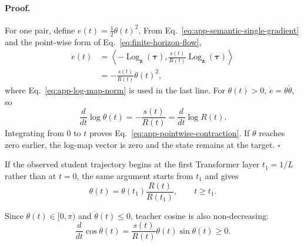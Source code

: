 \paragraph{Proof.}
For one pair, define $e(t)=\tfrac{1}{2}\theta(t)^2$. From
Eq.~\ref{eq:app-semantic-single-gradient} and the point-wise form of
Eq.~\ref{eq:finite-horizon-flow},
\begin{align}
    \dot{e}(t)
    &=
    \left\langle
        -\operatorname{Log}_{\mathbf{z}}(\boldsymbol{\tau}),
        \frac{s(t)}{R(t)}
        \operatorname{Log}_{\mathbf{z}}(\boldsymbol{\tau})
    \right\rangle
    \nonumber\\
    &=
    -\frac{s(t)}{R(t)}\theta(t)^2,
\end{align}
where Eq.~\ref{eq:app-log-map-norm} is used in the last line. For
$\theta(t)>0$, $\dot{e}=\theta\dot{\theta}$, so
\begin{equation}
    \frac{d}{dt}\log\theta(t)
    =
    -\frac{s(t)}{R(t)}
    =
    \frac{d}{dt}\log R(t).
\end{equation}
Integrating from $0$ to $t$ proves Eq.~\ref{eq:app-pointwise-contraction}. If
$\theta$ reaches zero earlier, the log-map vector is zero and the state remains
at the target. \hfill$\square$

If the observed student trajectory begins at the first Transformer layer
$t_1=1/L$ rather than at $t=0$, the same argument starts from $t_1$ and gives
\begin{equation}
    \theta(t)
    =
    \theta(t_1)\frac{R(t)}{R(t_1)},
    \qquad t\geq t_1.
    \label{eq:app-first-layer-contraction}
\end{equation}

Since $\theta(t)\in[0,\pi)$ and $\dot{\theta}(t)\leq0$, teacher cosine is also
non-decreasing:
\begin{equation}
    \frac{d}{dt}\cos\theta(t)
    =
    \frac{s(t)}{R(t)}
    \theta(t)\sin\theta(t)
    \geq0.
    \label{eq:app-cosine-monotonicity}
\end{equation}

